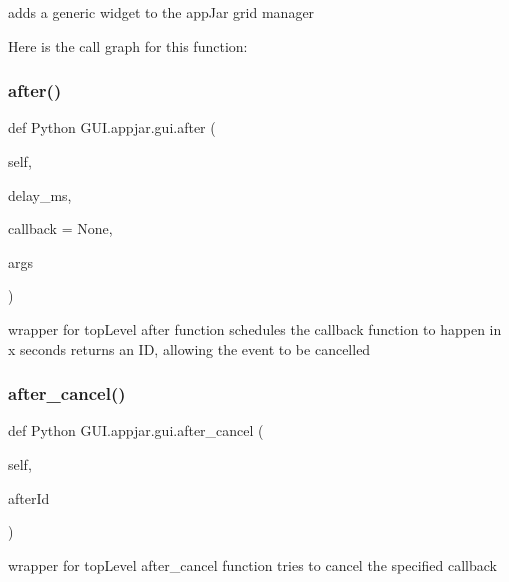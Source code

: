 \begin{DoxyVerb}adds a generic widget to the appJar grid manager \end{DoxyVerb}
 Here is the call graph for this function\+:
\mbox{\label{class_python_01_g_u_i_1_1appjar_1_1gui_a93a8c682a2fbc1fa491a0224e24fecc8}} 
\subsubsection{\texorpdfstring{after()}{after()}}
{\footnotesize\ttfamily def Python G\+U\+I.\+appjar.\+gui.\+after (\begin{DoxyParamCaption}\item[{}]{self,  }\item[{}]{delay\+\_\+ms,  }\item[{}]{callback = {\ttfamily None},  }\item[{}]{args }\end{DoxyParamCaption})}

\begin{DoxyVerb}wrapper for topLevel after function
    schedules the callback function to happen in x seconds
    returns an ID, allowing the event to be cancelled \end{DoxyVerb}
 \mbox{\label{class_python_01_g_u_i_1_1appjar_1_1gui_aa76abbe29ba1e69540f58126aa43e127}} 
\subsubsection{\texorpdfstring{after\+\_\+cancel()}{after\_cancel()}}
{\footnotesize\ttfamily def Python G\+U\+I.\+appjar.\+gui.\+after\+\_\+cancel (\begin{DoxyParamCaption}\item[{}]{self,  }\item[{}]{after\+Id }\end{DoxyParamCaption})}

\begin{DoxyVerb}wrapper for topLevel after_cancel function
    tries to cancel the specified callback \end{DoxyVerb}
 \mbox{\label{class_python_01_g_u_i_1_1appjar_1_1gui_a4944a0330a3d190f85180524670393d6}} 
